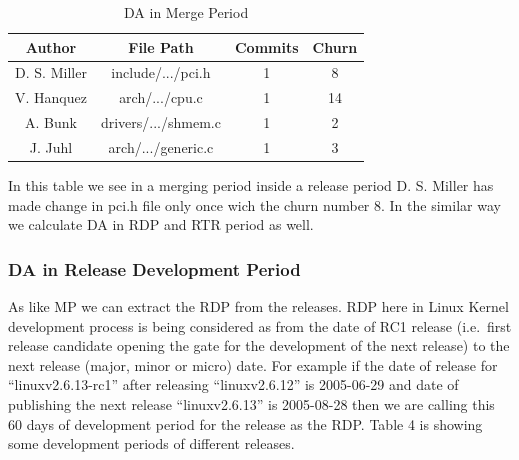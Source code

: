 \documentclass{acm_proc_article-sp}
\begin{document}
\begin{table}[ht]
\caption{DA in Merge Period}  %
\centering 						%
\begin{tabular}{c c c c}				%
\hline\hline						%
Author		& File Path			& Commits		& Churn \\ [0.5ex]
\hline 							%
D. S. Miller	& include/.../pci.h		& 1				& 8 \\
V. Hanquez	& arch/.../cpu.c		& 1				& 14 \\
A. Bunk		& drivers/.../shmem.c	& 1				& 2 \\
J. Juhl		& arch/.../generic.c		& 1				& 3 \\
[1ex]							%
\hline 							%
\end{tabular}
\label{table:nonlin} 				%
\end{table}

In this table we see in a merging period inside a release period D. S. Miller has made change in pci.h file only once wich the churn number 8. In the similar way we calculate DA in RDP and RTR period as well.

\subsubsection{DA in Release Development Period}
As like MP we can extract the RDP from the releases. RDP here in Linux Kernel development process is being considered as from the date of RC1 release (i.e.\ first release candidate opening the gate for the development of the next release) to the next release (major, minor or micro) date. For example if the date of release for ``linuxv2.6.13-rc1'' after releasing ``linuxv2.6.12'' is 2005-06-29 and date of publishing the next release ``linuxv2.6.13'' is 2005-08-28 then we are calling this 60 days of development period for the release as the RDP. Table 4 is showing some development periods of different releases.
\end{document}
